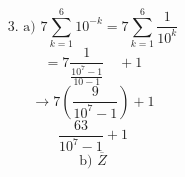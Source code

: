 \documentclass{article}
\begin{document}
\[
3. \text{ a) } 7 \sum_{k=1}^{6} 10^{-k} = 7 \sum_{k=1}^{6} \frac{1}{10^k}
\]
\[
= 7 \frac{1}{\frac{10^7-1}{10-1}} \quad + 1
\]
\[
\rightarrow 7 \left(\frac{9}{10^7-1}\right) + 1
\]
\[
\frac{63}{10^7 - 1} + 1
\]
\[
\text{b) } \overline{Z}
\]
\end{document}
